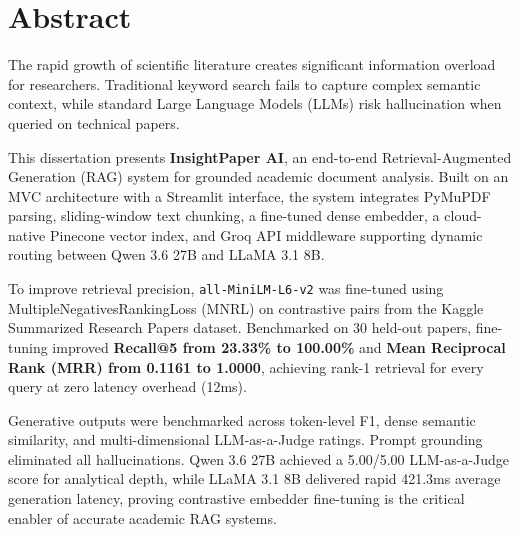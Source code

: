 \chapter*{Abstract}

The rapid growth of scientific literature creates significant information overload for researchers. Traditional keyword search fails to capture complex semantic context, while standard Large Language Models (LLMs) risk hallucination when queried on technical papers.

This dissertation presents \textbf{InsightPaper AI}, an end-to-end Retrieval-Augmented Generation (RAG) system for grounded academic document analysis. Built on an MVC architecture with a Streamlit interface, the system integrates PyMuPDF parsing, sliding-window text chunking, a fine-tuned dense embedder, a cloud-native Pinecone vector index, and Groq API middleware supporting dynamic routing between Qwen 3.6 27B and LLaMA 3.1 8B.

To improve retrieval precision, \texttt{all-MiniLM-L6-v2} was fine-tuned using MultipleNegativesRankingLoss (MNRL) on contrastive pairs from the Kaggle Summarized Research Papers dataset. Benchmarked on 30 held-out papers, fine-tuning improved \textbf{Recall@5 from 23.33\% to 100.00\%} and \textbf{Mean Reciprocal Rank (MRR) from 0.1161 to 1.0000}, achieving rank-1 retrieval for every query at zero latency overhead (12ms).

Generative outputs were benchmarked across token-level F1, dense semantic similarity, and multi-dimensional LLM-as-a-Judge ratings. Prompt grounding eliminated all hallucinations. Qwen 3.6 27B achieved a 5.00/5.00 LLM-as-a-Judge score for analytical depth, while LLaMA 3.1 8B delivered rapid 421.3ms average generation latency, proving contrastive embedder fine-tuning is the critical enabler of accurate academic RAG systems.
